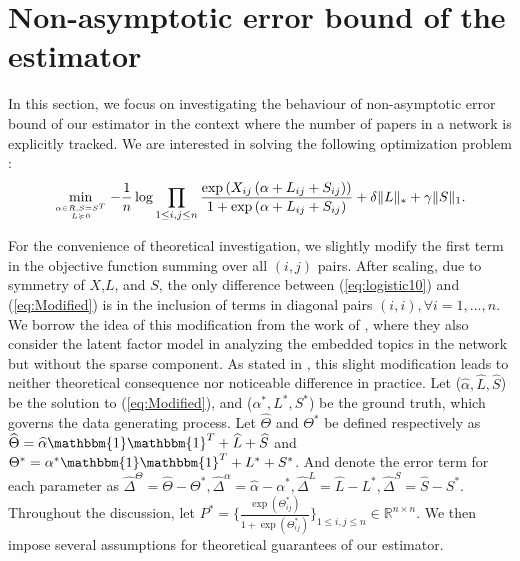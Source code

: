 \documentclass[AMS,STIX1COL]{WileyNJD-v2}
\begin{document}
{\section{Non-asymptotic error bound of the estimator}
\label{sec:theorem}
In this section, we focus on investigating the behaviour of non-asymptotic error bound of our estimator in the context where the number of papers in a network is explicitly tracked. We are interested in solving the following optimization problem :
\begin{equation}\label{eq:Modified}
\min\limits_{\alpha \in R, S = S^T \atop L \succcurlyeq 0}
-\frac{1}{n} \log \prod_{1\le i,j\le n}\frac{\exp\left(X_{ij}\left(\alpha+
L_{ij}+S_{ij}\right)\right)}{1+\exp\left(\alpha+
L_{ij}+S_{ij}\right)} + \delta \|L\|_\ast + \gamma \|S\|_1.
\end{equation}

For the convenience of theoretical investigation, we slightly modify the first term in the objective function summing over all $(i,j)$ pairs.
After scaling, due to symmetry of $X$,$L$, and $S$, the only difference between (\ref{eq:logistic10}) and (\ref{eq:Modified}) is in the inclusion of terms in diagonal pairs $(i,i),\forall i=1,\dots,n$.
We borrow the idea of this modification from the work of \cite{ma2017exploration}, where they also consider the latent factor model in analyzing the embedded topics in the network but without the sparse component.
As stated in \cite{ma2017exploration}, this slight modification leads to neither theoretical consequence nor noticeable difference in practice.
Let ($\widehat{\alpha},\widehat{L},\widehat{S}$) be the solution to (\ref{eq:Modified}), and ($\alpha^{*},L^{*},S^{*}$) be the ground truth, which governs the data generating process.
Let $\widehat{\Theta}$ and $\Theta^{*}$ be defined respectively as $\widehat{\Theta} = \widehat{\alpha}\mathbbm{1}\mathbbm{1}^T+\widehat{L}+\widehat{S}$ and $\Theta^{*} = \alpha^{*}\mathbbm{1}\mathbbm{1}^T+L^{*}+S^{*}$.
And denote the error term for each parameter as $\widehat{\Delta}^{\Theta} = \widehat{\Theta}-\Theta^{*},
\widehat{\Delta}^{\alpha} = \widehat{\alpha}-\alpha^{*},
\widehat{\Delta}^L = \widehat{L}-L^{*},
\widehat{\Delta}^S = \widehat{S}-S^{*}.$
Throughout the discussion, let $P^{*}=\bigg\{\frac{\exp(\Theta_{ij}^{*})}{1+\exp(\Theta_{ij}^{*})}\bigg\}_{1 \leq i,j \leq n} \in \mathbb{R}^{n \times n}$.
We then impose several assumptions for theoretical guarantees of our estimator.

}
\end{document}
